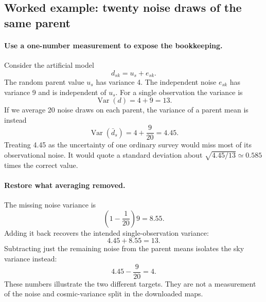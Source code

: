 \documentclass[11pt]{article}
\newcommand{\Var}{\operatorname{Var}}
\begin{document}
\subsection{Worked example: twenty noise draws of the same parent}
\paragraph{Use a one-number measurement to expose the bookkeeping.}
Consider the artificial model
\begin{equation}
 d_{sk}=u_s+e_{sk}.
\end{equation}
The random parent value $u_s$ has variance 4. The independent noise $e_{sk}$
has variance 9 and is independent of $u_s$. For a single observation the
variance is
\begin{equation}
 \Var(d)=4+9=13.
\end{equation}
If we average 20 noise draws on each parent, the variance of a parent mean
is instead
\begin{equation}
 \Var(\bar d_s)=4+\frac9{20}=4.45.
\end{equation}
Treating 4.45 as the uncertainty of one ordinary survey would miss most
of its observational noise. It would quote a standard deviation about
$\sqrt{4.45/13}\simeq0.585$ times the correct value.

\paragraph{Restore what averaging removed.}
The missing noise variance is
\begin{equation}
 \left(1-\frac1{20}\right)9=8.55.
\end{equation}
Adding it back recovers the intended single-observation variance:
\begin{equation}
 4.45+8.55=13.
\end{equation}
Subtracting just the remaining noise from the parent means isolates the
sky variance instead:
\begin{equation}
 4.45-\frac9{20}=4.
\end{equation}
These numbers illustrate the two different targets. They are not a
measurement of the noise and cosmic-variance split in the downloaded maps.
\end{document}
